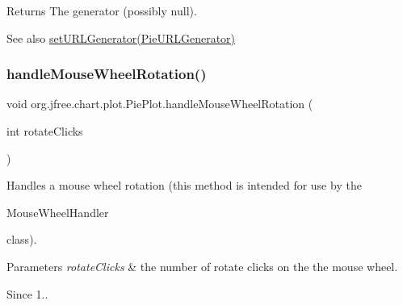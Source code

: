 \begin{DoxyReturn}{Returns}
The generator (possibly {\ttfamily null}).
\end{DoxyReturn}
\begin{DoxySeeAlso}{See also}
\mbox{\hyperlink{classorg_1_1jfree_1_1chart_1_1plot_1_1_pie_plot_ab62afb77f16e5fe72a997e92a093da6d}{set\+U\+R\+L\+Generator(\+Pie\+U\+R\+L\+Generator)}} 
\end{DoxySeeAlso}
\mbox{\label{classorg_1_1jfree_1_1chart_1_1plot_1_1_pie_plot_a4ec2feb277a330f9c9b1dc1fd554362d}} 
\subsubsection{\texorpdfstring{handle\+Mouse\+Wheel\+Rotation()}{handleMouseWheelRotation()}}
{\footnotesize\ttfamily void org.\+jfree.\+chart.\+plot.\+Pie\+Plot.\+handle\+Mouse\+Wheel\+Rotation (\begin{DoxyParamCaption}\item[{int}]{rotate\+Clicks }\end{DoxyParamCaption})}

Handles a mouse wheel rotation (this method is intended for use by the 
\begin{DoxyCode}
MouseWheelHandler 
\end{DoxyCode}
 class).


\begin{DoxyParams}{Parameters}
{\em rotate\+Clicks} & the number of rotate clicks on the the mouse wheel.\\
\hline
\end{DoxyParams}
\begin{DoxySince}{Since}
1.. 
\end{DoxySince}
\mbox{\label{classorg_1_1jfree_1_1chart_1_1plot_1_1_pie_plot_a156604874bd3cfadee0f85e1b9066eaa}} 
